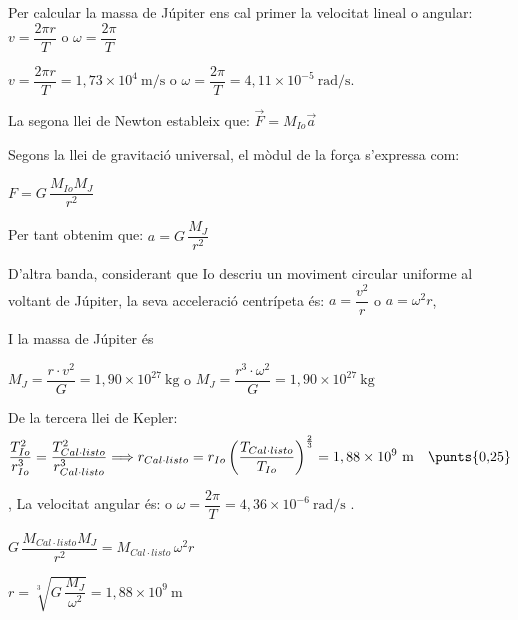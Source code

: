 \begin{solapartat}
 Per calcular la massa de Júpiter ens cal primer la velocitat lineal o angular: $v = \dfrac{2\pi r}{T}$ o $\omega = \dfrac{2\pi}{T}$

 $v = \dfrac{2\pi r}{T} = 1,73\times 10^{4}\ \mathrm{m/s}$ o $\omega = \dfrac{2\pi}{T} = 4,11\times 10^{-5}\ \mathrm{rad/s}$.

 La segona llei de Newton estableix que: $\vec{F} = M_{Io}\vec{a}$

Segons la llei de gravitació universal, el mòdul de la força s'expressa com:

$F = G\,\dfrac{M_{Io}M_J}{r^2}$ \quad {}

Per tant obtenim que: $a = G\,\dfrac{M_J}{r^2}$ \quad {}

 D'altra banda, considerant que Io descriu un moviment circular uniforme al voltant de Júpiter, la seva acceleració centrípeta és: $a = \dfrac{v^2}{r}$ o $a = \omega^2 r$,

I la massa de Júpiter és

 $M_J = \dfrac{r\cdot v^2}{G} = 1,90\times 10^{27}\ \mathrm{kg}$ o $M_J = \dfrac{r^3\cdot\omega^2}{G} = 1,90\times 10^{27}\ \mathrm{kg}$ \quad {}
\end{solapartat}

\begin{solapartat}
 De la tercera llei de Kepler:
\[ \frac{T_{Io}^2}{r_{Io}^3} = \frac{T_{Cal\cdot listo}^2}{r_{Cal\cdot listo}^3} \Longrightarrow r_{Cal\cdot listo} = r_{Io}\left(\frac{T_{Cal\cdot listo}}{T_{Io}}\right)^{\frac{2}{3}} = 1,88\times 10^{9}\ \mathrm{m} \quad \text{\punts{0,25}} \]


, La velocitat angular és: o $\omega = \dfrac{2\pi}{T} = 4,36\times 10^{-6}\ \mathrm{rad/s}$ .

 $G\,\dfrac{M_{Cal\cdot listo}M_J}{r^2} = M_{Cal\cdot listo}\,\omega^2 r$

 $r = \sqrt[3]{G\,\dfrac{M_J}{\omega^2}} = 1,88\times 10^{9}\ \mathrm{m}$ \quad {}
\end{solapartat}
